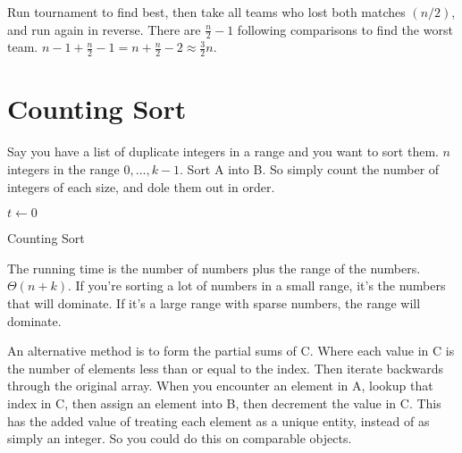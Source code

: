 \documentclass[english, 10pt]{article}
\begin{document}
Run tournament to find best, then take all teams who lost both matches $(n/2)$,
and run again in reverse. There are $\frac{n}{2}-1$ following comparisons to
find the worst team. $n-1+\frac{n}{2}-1 = n+\frac{n}{2}-2 \approx \frac{3}{2}n$.



\section{Counting Sort}

Say you have a list of duplicate integers in a range and you want to sort them.
$n$ integers in the range $0,\ldots,k-1$. Sort A into B. So simply count the number of integers of each size, and dole them out in order.

\begin{algorithm}
    $t\gets 0$\;
    \caption{Counting Sort}
\end{algorithm}

The running time is the number of numbers plus the range of the numbers.
$\Theta(n+k)$.  If you're sorting a lot of numbers in a small range, it's the
numbers that will dominate. If it's a large range with sparse numbers, the
range will dominate.

An alternative method is to form the partial sums of C. Where each value in C
is the number of elements less than or equal to the index. Then iterate
backwards through the original array. When you encounter an element in A,
lookup that index in C, then assign an element into B, then decrement the value
in C. This has the added value of treating each element as a unique entity,
instead of as simply an integer. So you could do this on comparable objects.
\end{document}
